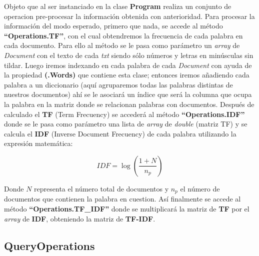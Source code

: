 \documentclass[a4paper,12pt]{article}
\begin{document}
\begin{center}
 Objeto que al ser instanciado en la clase \textbf{Program} realiza un conjunto de operacion
 pre-procesar la información obtenida con anterioridad. Para procesar la información del modo 
 esperado, primero que nada, se accede al método \textbf{“Operations.TF”}, con el cual obtendremos la
 frecuencia de cada palabra en cada documento. Para ello al método se le pasa como parámetro 
 un \emph{array} de \emph{Document} con el texto de cada \emph{txt} siendo sólo números y letras en minúsculas sin 
 tildar. Luego iremos indexando en cada palabra de cada \emph{Document} con ayuda de la propiedad 
 \textbf{(.Words)} que contiene esta clase; entonces iremos añadiendo cada palabra a un diccionario
 (aquí agruparemos todas las palabras distintas de nuestros documentos) ahí se le asociará un
 índice que será la columna que ocupa la palabra en la matriz donde se relacionan palabras con
 documentos. Después de calculado el \textbf{TF} (Term Frecuency) se accederá al método \textbf{“Operations.IDF”}
 donde se le pasa como parámetro una lista de \emph{array} de \emph{double} (matriz TF) y se calcula el \textbf{IDF}
 (Inverse Document Frecuency) de cada palabra utilizando la expresión matemática:

 \begin{equation}
   IDF = \log(\frac{1+ N}{n_p})
 \end{equation} 

 Donde $N$ representa el número total de documentos y $n_p$ el número de documentos que contienen la palabra en cuestion.
 Así finalmente se accede al método \textbf{“Operations.TF\_IDF”} donde se multiplicará la matriz de \textbf{TF} por el \emph{array} 
 de \textbf{IDF}, obteniendo la matriz de \textbf{TF-IDF}.

 \subsection{QueryOperations}


\end{center}
\end{document}
